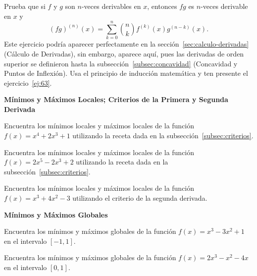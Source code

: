 \documentclass[12pt,a4paper]{book}
\newcommand{\subtitulo}[1]{\par\avoidorphan{5}\addvspace{\medskipamount}\noindent\textbf{#1}\par\nobreak}
\begin{document}
    \begin{ejercicio}\label{ej:281}
        Prueba que si $f$ y $g$ son $n$-veces
        derivables en $x$, entonces $fg$ es $n$-veces derivable en $x$ y
        \begin{equation*}
            (fg)^{(n)}(x)=\sum_{k=0}^{n}\binom{n}{k}f^{(k)}(x)g^{(n-k)}(x).
        \end{equation*}
        Este ejercicio podría aparecer perfectamente en la sección~\ref{sec:calculo-derivadas} (Cálculo de
        Derivadas), sin embargo, aparece aquí, pues las derivadas de orden superior
        se definieron hasta la subsección~\ref{subsec:concavidad} (Concavidad y Puntos de Inflexión).
        \sugerencia Usa el principio de inducción matemática y ten presente el
        ejercicio~\ref{ej:63}.
    \end{ejercicio}

    \subtitulo{Mínimos y Máximos Locales; Criterios de la Primera y Segunda Derivada}

    \begin{ejercicio}\label{ej:282}
        Encuentra los mínimos locales y máximos locales de la función
        $f(x)=x^{4}+2x^{3}+1$ utilizando la receta dada en la subsección~\ref{subsec:criterios}.
    \end{ejercicio}

    \begin{ejercicio}\label{ej:283}
        Encuentra los mínimos locales y máximos locales de la función
        $f(x)=2x^{5}-2x^{3}+2$ utilizando la receta dada en la subsección~\ref{subsec:criterios}.
    \end{ejercicio}

    \begin{ejercicio}\label{ej:284}
        Encuentra los mínimos locales y máximos locales de la función
        $f(x)=x^{3}+4x^{2}-3$ utilizando el criterio de la segunda derivada.
    \end{ejercicio}

    \subtitulo{Mínimos y Máximos Globales}

    \begin{ejercicio}\label{ej:285}
        Encuentra los mínimos y máximos globales de la función
        $f(x)=x^{3}-3x^{2}+1$ en el intervalo $[-1,1]$.
    \end{ejercicio}

    \begin{ejercicio}\label{ej:286}
        Encuentra los mínimos y máximos globales de la función
        $f(x)=2x^{3}-x^{2}-4x$ en el intervalo $[0,1]$.
    \end{ejercicio}
\end{document}
